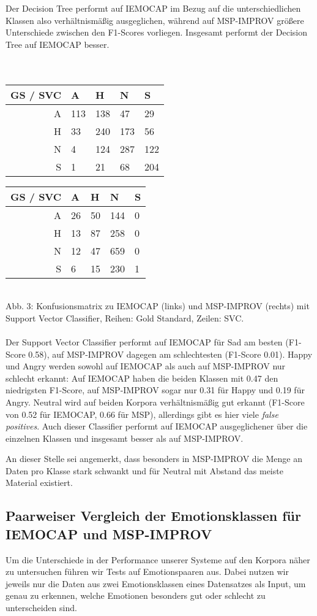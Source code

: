 \documentclass{article} %
\begin{document}
Der Decision Tree performt auf IEMOCAP im Bezug auf die unterschiedlichen Klassen also verhältnismäßig ausgeglichen, während auf MSP-IMPROV größere Unterschiede zwischen den F1-Scores vorliegen. Insgesamt performt der Decision Tree auf IEMOCAP besser. \\ \\ \\
\begin{tabular}{|r|llll|}
\hline
GS / SVC & A & H & N & S \\
\hline
A & 113 & 138 & 47 & 29 \\
H & 33 & 240 & 173 & 56 \\
N & 4 & 124 & 287 & 122 \\
S & 1 & 21 & 68 & 204 \\
\hline
\end{tabular} 
\begin{tabular}{|r|llll|}
\hline
GS / SVC & A & H & N & S \\
\hline
A & 26 & 50 & 144 & 0 \\
H & 13 & 87 & 258 & 0 \\
N & 12 & 47 & 659 & 0 \\
S & 6 & 15 & 230 & 1 \\
\hline
\end{tabular} \\
Abb. 3: Konfusionsmatrix zu IEMOCAP (links) und MSP-IMPROV (rechts) mit Support Vector Classifier, Reihen: Gold Standard, Zeilen: SVC. \\ \\
Der Support Vector Classifier performt auf IEMOCAP für Sad am besten (F1-Score 0.58), auf MSP-IMPROV dagegen am schlechtesten (F1-Score 0.01). Happy und Angry werden sowohl auf IEMOCAP als auch auf MSP-IMPROV nur schlecht erkannt: Auf IEMOCAP haben die beiden Klassen mit 0.47 den niedrigsten F1-Score, auf MSP-IMPROV sogar nur 0.31 für Happy und 0.19 für Angry. 
Neutral wird auf beiden Korpora verhältnismäßig gut erkannt (F1-Score von 0.52 für IEMOCAP, 0.66 für MSP), allerdings gibt es hier viele \emph{false positives}. Auch dieser Classifier performt auf IEMOCAP ausgeglichener über die einzelnen Klassen und insgesamt besser als auf MSP-IMPROV. 

An dieser Stelle sei angemerkt, dass besonders in MSP-IMPROV die Menge an Daten pro Klasse stark schwankt und für Neutral mit Abstand das meiste Material existiert. 
\subsection{Paarweiser Vergleich der Emotionsklassen für IEMOCAP und MSP-IMPROV}
Um die Unterschiede in der Performance unserer Systeme auf den Korpora näher zu untersuchen führen wir Tests auf Emotionspaaren aus. Dabei nutzen wir jeweils nur die Daten aus zwei Emotionsklassen eines Datensatzes als Input, um genau zu erkennen, welche Emotionen besonders gut oder schlecht zu unterscheiden sind. 
\end{document}
